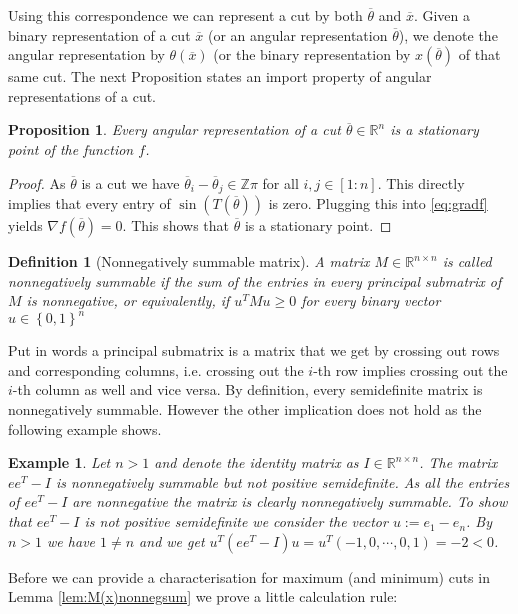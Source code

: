 \documentclass[12pt,a4paper]{article}
\theoremstyle{mythm}
\newtheorem{Def}[thm]{Definition}
\newtheorem{prop}[thm]{Proposition}
\newtheorem*{exa}{Example}
\begin{document}
Using this correspondence we can represent a cut by both $ \overline{ \theta }  $ and $ \overline{ x }  $. Given a binary representation of a cut $ \overline{ x }  $ (or an
angular representation $ \overline{ \theta }  $), we denote the angular representation by $ \theta ( \overline{ x } ) $ 
(or the binary representation by $ x ( \overline{ \theta } ) $ of that same cut.
The next Proposition states an import property of angular representations of a cut.
\begin{prop}
\label{prop:cutsArestationaryPoints} 
Every angular representation of a cut $ \overline{ \theta } \in \mathbb{R} ^{ n }  $ is a stationary point of the function $ f $.
\end{prop} 
\begin{proof}
As $ \overline{ \theta } $ is a cut we have $ \overline{ \theta } _{ i } - \overline{ \theta } _{ j } \in \mathbb{Z} \pi  $ for all $ i,j \in \left[ 1:n \right]  $. 
This directly implies that every entry of $ \sin( T ( \overline{ \theta } ) )  $ is zero. Plugging this into \ref{eq:gradf} yields $ \nabla f ( \overline{ \theta } ) = 0$.
This shows that $ \overline{ \theta }  $ is a stationary point.
\end{proof}
\begin{Def}[Nonnegatively summable matrix]
A matrix $ M \in \mathbb{R} ^{ n \times n }  $ is called nonnegatively summable if the sum of the entries in every principal submatrix of $ M $ is nonnegative, or
equivalently, if $ u ^{ T} M u \geq 0    $ for every binary vector $ u \in \left\{ 0,1 \right\} ^{ n }  $ 
\end{Def} 
Put in words a principal submatrix is a matrix that we get by crossing out rows and corresponding columns, i.e. crossing out the $ i$-th row implies crossing out the $ i
$-th column as well and vice versa.
By definition, every semidefinite matrix is nonnegatively summable. However the other implication does not hold as the following example shows.
\begin{exa}
Let $ n>1 $ and denote the identity matrix as $ I \in \mathbb{R} ^{ n \times n }  $.
The matrix $ ee^T - I $ is nonnegatively summable but not positive semidefinite.
As all the entries of $ ee^T - I $ are nonnegative the matrix is clearly nonnegatively summable.
To show that $ ee^T - I $ is not positive semidefinite we consider the vector $ u := e_1 - e_n $. By $ n>1  $ we have $ 1 \neq n  $ and we get 
$ u ^T \left( ee^T - I \right) u = u^T \left( -1,0, \cdots, 0,1 \right) = -2 < 0  $.
\end{exa} 
Before we can provide a characterisation for maximum (and minimum) cuts in Lemma \ref{lem:M(x)nonnegsum} we prove a little calculation rule:
\end{document}
